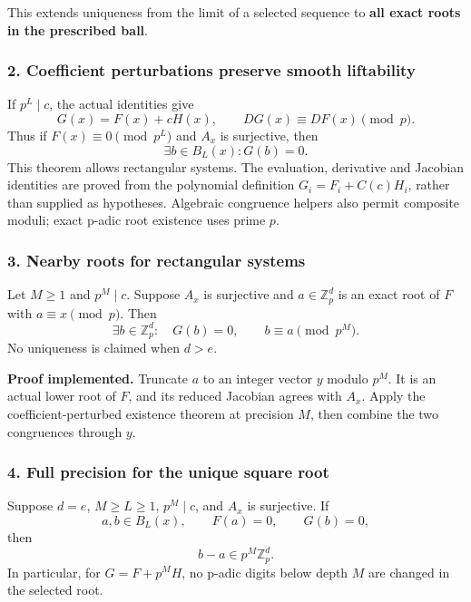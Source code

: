 This extends uniqueness from the limit of a selected sequence to
\textbf{all exact roots in the prescribed ball}.

\hypertarget{cont4:coefficient-perturbations-preserve-smooth-liftability}{%
\subsubsection{2. Coefficient perturbations preserve smooth
liftability}\label{cont4:coefficient-perturbations-preserve-smooth-liftability}}

If \(p^L\mid c\), the actual identities give \[
G(x)=F(x)+cH(x),\qquad DG(x)\equiv DF(x)\pmod p.
\] Thus if \(F(x)\equiv0\pmod{p^L}\) and \(A_x\) is surjective, then \[
\exists b\in B_L(x):G(b)=0.
\] This theorem allows rectangular systems. The evaluation, derivative
and Jacobian identities are proved from the polynomial definition
\(G_i=F_i+C(c)H_i\), rather than supplied as hypotheses. Algebraic
congruence helpers also permit composite moduli; exact p-adic root
existence uses prime \(p\).

\hypertarget{cont4:nearby-roots-for-rectangular-systems}{%
\subsubsection{3. Nearby roots for rectangular
systems}\label{cont4:nearby-roots-for-rectangular-systems}}

Let \(M\ge1\) and \(p^M\mid c\). Suppose \(A_x\) is surjective and
\(a\in\mathbb Z_p^d\) is an exact root of \(F\) with
\(a\equiv x\pmod p\). Then \[
\boxed{\exists b\in\mathbb Z_p^d:\quad G(b)=0,
\qquad b\equiv a\pmod{p^M}.}
\] No uniqueness is claimed when \(d>e\).

\textbf{Proof implemented.} Truncate \(a\) to an integer vector \(y\)
modulo \(p^M\). It is an actual lower root of \(F\), and its reduced
Jacobian agrees with \(A_x\). Apply the coefficient-perturbed existence
theorem at precision \(M\), then combine the two congruences through
\(y\).

\hypertarget{cont4:full-precision-for-the-unique-square-root}{%
\subsubsection{4. Full precision for the unique square
root}\label{cont4:full-precision-for-the-unique-square-root}}

Suppose \(d=e\), \(M\ge L\ge1\), \(p^M\mid c\), and \(A_x\) is
surjective. If \[
a,b\in B_L(x),\qquad F(a)=0,\qquad G(b)=0,
\] then \[
\boxed{b-a\in p^M\mathbb Z_p^d.}
\] In particular, for \(G=F+p^MH\), no p-adic digits below depth \(M\)
are changed in the selected root.

